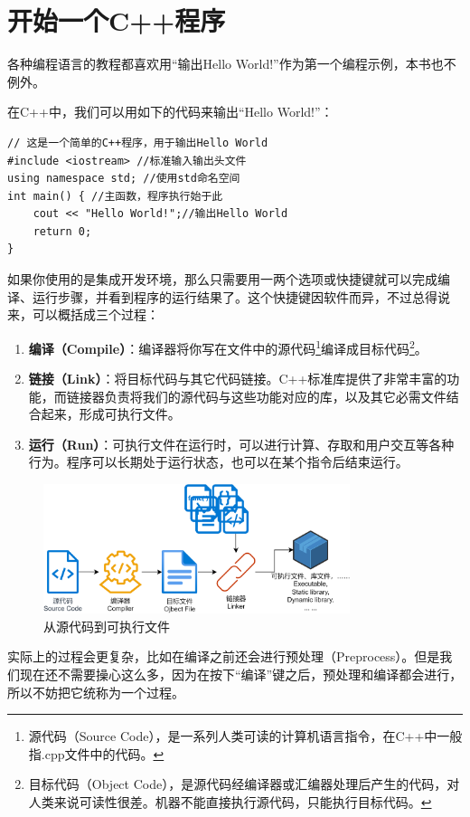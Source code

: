 \section{开始一个C++程序}
各种编程语言的教程都喜欢用``输出Hello World!''作为第一个编程示例，本书也不例外。\par
在C++中，我们可以用如下的代码来输出``Hello World!''：
\begin{lstlisting}[caption=\texttt{Hello\_World.cpp},label={lst:HelloWorld}]
// 这是一个简单的C++程序，用于输出Hello World
#include <iostream> //标准输入输出头文件
using namespace std; //使用std命名空间
int main() { //主函数，程序执行始于此
    cout << "Hello World!";//输出Hello World
    return 0;
}
\end{lstlisting}
如果你使用的是集成开发环境，那么只需要用一两个选项或快捷键就可以完成编译、运行步骤，并看到程序的运行结果了。这个快捷键因软件而异，不过总得说来，可以概括成三个过程：
\begin{enumerate}
    \item \textbf{编译（Compile）}：编译器将你写在文件中的源代码\footnote{源代码（Source Code），是一系列人类可读的计算机语言指令，在C++中一般指.cpp文件中的代码。}编译成目标代码\footnote{目标代码（Object Code），是源代码经编译器或汇编器处理后产生的代码，对人类来说可读性很差。机器不能直接执行源代码，只能执行目标代码。}。
    \item \textbf{链接（Link）}：将目标代码与其它代码链接。C++标准库提供了非常丰富的功能，而链接器负责将我们的源代码与这些功能对应的库，以及其它必需文件结合起来，形成可执行文件。
    \item \textbf{运行（Run）}：可执行文件在运行时，可以进行计算、存取和用户交互等各种行为。程序可以长期处于运行状态，也可以在某个指令后结束运行。
\end{enumerate}
\begin{figure}[htbp]
    \centering
    \includegraphics[width=0.8\textwidth]{../images/generalized_parts/01_From_source_code_to_executable_300.png}
    \caption{从源代码到可执行文件}
\end{figure}
实际上的过程会更复杂，比如在编译之前还会进行预处理（Preprocess）。但是我们现在还不需要操心这么多，因为在按下``编译''键之后，预处理和编译都会进行，所以不妨把它统称为一个过程。\par

